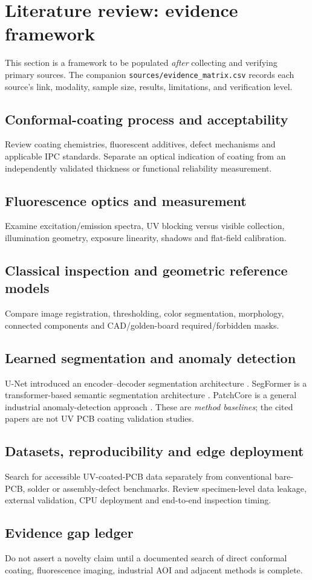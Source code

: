 \section{Literature review: evidence framework}

This section is a framework to be populated \emph{after} collecting and verifying
primary sources. The companion \texttt{sources/evidence\_matrix.csv} records each
source's link, modality, sample size, results, limitations, and verification level.

\subsection{Conformal-coating process and acceptability}
Review coating chemistries, fluorescent additives, defect mechanisms and applicable
IPC standards. Separate an optical indication of coating from an independently
validated thickness or functional reliability measurement.

\subsection{Fluorescence optics and measurement}
Examine excitation/emission spectra, UV blocking versus visible collection,
illumination geometry, exposure linearity, shadows and flat-field calibration.

\subsection{Classical inspection and geometric reference models}
Compare image registration, thresholding, color segmentation, morphology,
connected components and CAD/golden-board required/forbidden masks.

\subsection{Learned segmentation and anomaly detection}
U-Net introduced an encoder--decoder segmentation architecture
\citep{ronneberger2015unet}. SegFormer is a transformer-based semantic
segmentation architecture \citep{xie2021segformer}. PatchCore is a general
industrial anomaly-detection approach \citep{roth2022patchcore}.
These are \emph{method baselines}; the cited papers are not UV PCB coating
validation studies.

\subsection{Datasets, reproducibility and edge deployment}
Search for accessible UV-coated-PCB data separately from conventional bare-PCB,
solder or assembly-defect benchmarks. Review specimen-level data leakage,
external validation, CPU deployment and end-to-end inspection timing.

\subsection{Evidence gap ledger}
Do not assert a novelty claim until a documented search of direct conformal
coating, fluorescence imaging, industrial AOI and adjacent methods is complete.
